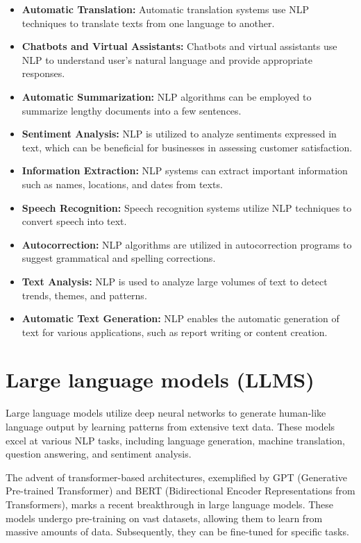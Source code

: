 \begin{itemize}
    \item \textbf{Automatic Translation:} Automatic translation systems use NLP techniques to translate texts from one language to another.
    \item \textbf{Chatbots and Virtual Assistants:} Chatbots and virtual assistants use NLP to understand user's natural language and provide appropriate responses.
    \item \textbf{Automatic Summarization:} NLP algorithms can be employed to summarize lengthy documents into a few sentences.
    \item \textbf{Sentiment Analysis:} NLP is utilized to analyze sentiments expressed in text, which can be beneficial for businesses in assessing customer satisfaction.
    \item \textbf{Information Extraction:} NLP systems can extract important information such as names, locations, and dates from texts.
    \item \textbf{Speech Recognition:} Speech recognition systems utilize NLP techniques to convert speech into text.
    \item \textbf{Autocorrection:} NLP algorithms are utilized in autocorrection programs to suggest grammatical and spelling corrections.
    \item \textbf{Text Analysis:} NLP is used to analyze large volumes of text to detect trends, themes, and patterns.
    \item \textbf{Automatic Text Generation:} NLP enables the automatic generation of text for various applications, such as report writing or content creation.
\end{itemize}


\section{Large language models (LLMS)}

Large language models utilize deep neural networks to generate human-like language output by learning patterns from extensive text data. These models excel at various NLP tasks, including language generation, machine translation, question answering, and sentiment analysis.

The advent of transformer-based architectures, exemplified by GPT (Generative Pre-trained Transformer) and BERT (Bidirectional Encoder Representations from Transformers), marks a recent breakthrough in large language models. These models undergo pre-training on vast datasets, allowing them to learn from massive amounts of data. Subsequently, they can be fine-tuned for specific tasks.

